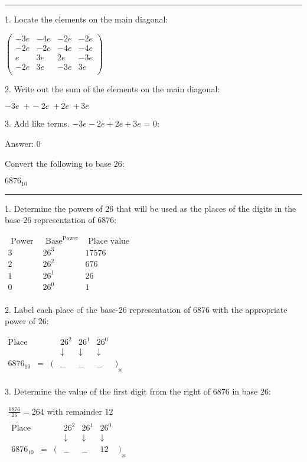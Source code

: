 \documentclass{article}
\begin{document}
\hrule

1. Locate the elements on the main diagonal:

$\left(
\begin{array}{cccc}
-3 e & -4 e & -2 e & -2 e \\
 -2 e & -2 e & -4 e & -4 e \\
 e & 3 e & 2 e & -3 e \\
 -2 e & 3 e & -3 e & 3 e \\
\end{array}
\right)$

2. Write out the sum of the elements on the main diagonal:

$-3 e\,\text{ +$\, $}-2 e\,\text{ +$\, $}2 e\,\text{ +$\, $}3 e$

3. Add like terms. $-3 e-2 e+2 e+3 e\text{ = }0:$

Answer: $0$

\pagebreak

Convert the following to base $26:$

$6876_{10}$

\hrule

1. Determine the powers of 26 that will be used as the places of the digits in the base-26 representation of $6876:$

$\begin{array}{|c|c|c}
\hline
\text{ Power }&\text{ Base}^{\text{Power}} &\text{ Place value }\\
\hline
 3 & 26^3 & 17576 \\
\hline
 2 & 26^2 & 676 \\
 1 & 26^1 & 26 \\
 0 & 26^0 & 1 \\
\end{array}$

2. Label each place of the base-26 representation of 6876 with the appropriate power of $26:$

$\begin{array}{ccccccc}
\text{Place }&   &   & 26^2 & 26^1 & 26^0 &   \\
   &   &   & \downarrow  & \downarrow  & \downarrow  &   \\
 6876_{10} & = & ( & \_\_ & \_\_ & \_\_ & )_{\text{}_{26}} \\
\end{array}$

3. Determine the value of the first digit from the right of 6876 in base $26:$

$\begin{array}{l}
\frac{6876}{26}=264\text{ with remainder }12 \\
 
\begin{array}{ccccccc}
\text{Place }&   &   & 26^2 & 26^1 & 26^0 &   \\
   &   &   & \downarrow  & \downarrow  & \downarrow  &   \\
 6876_{10} & = & ( & \_\_ & \_\_ & 12 & )_{\text{}_{26}} \\
\end{array}
 \\
\end{array}$
\end{document}
